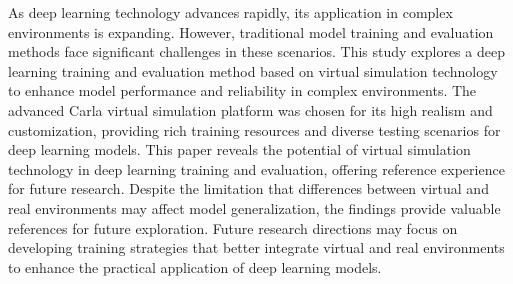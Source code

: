 \begin{abstracten}

    As deep learning technology advances rapidly, its application in complex environments is expanding. However, traditional model training and evaluation methods face significant challenges in these scenarios. This study explores a deep learning training and evaluation method based on virtual simulation technology to enhance model performance and reliability in complex environments. The advanced Carla virtual simulation platform was chosen for its high realism and customization, providing rich training resources and diverse testing scenarios for deep learning models.
    This paper reveals the potential of virtual simulation technology in deep learning training and evaluation, offering reference experience for future research. Despite the limitation that differences between virtual and real environments may affect model generalization, the findings provide valuable references for future exploration. Future research directions may focus on developing training strategies that better integrate virtual and real environments to enhance the practical application of deep learning models.
    



\end{abstracten}